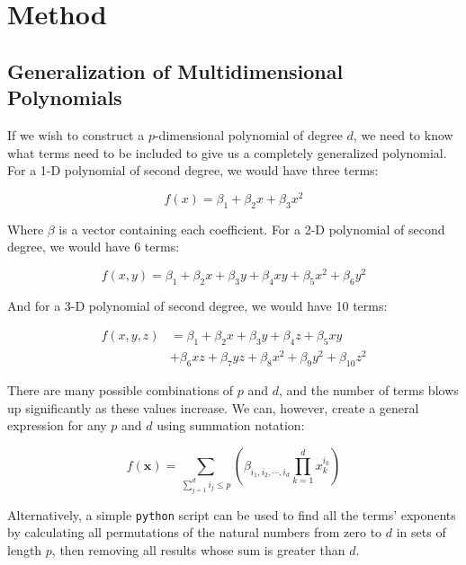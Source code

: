 \documentclass[a4paper,10pt,english]{article}
\begin{document}
\section*{Method}

\subsection*{Generalization of Multidimensional Polynomials}

If we wish to construct a $p$-dimensional polynomial of degree $d$, we need to know what terms need to be included to give us a completely generalized polynomial.  For a 1-D polynomial of second degree, we would have three terms:

\begin{equation*}
f(x) = \beta_1 + \beta_2 x + \beta_3 x^2
\end{equation*}

Where $\beta$ is a vector containing each coefficient.	For a 2-D polynomial of second degree, we would have 6 terms:

\begin{equation*}
f(x,y) = \beta_1 + \beta_2 x + \beta_3 y + \beta_4 xy + \beta_5 x^2 + \beta_6 y^2
\end{equation*}

And for a 3-D polynomial of second degree, we would have 10 terms:

\begin{align*}
f(x,y,z) &= \beta_1 + \beta_2 x + \beta_3 y + \beta_4 z + \beta_5 xy \\ &+ \beta_6 xz + \beta_7 yz + \beta_8 x^2 + \beta_9 y^2 + \beta_{10} z^2
\end{align*}

There are many possible combinations of $p$ and $d$, and the number of terms blows up significantly as these values increase.  We can, however, create a general expression \cite{2482654} for any $p$ and $d$ using summation notation:

\begin{equation}
\label{eq_method_0}
f(\mathbf{x}) = \sum_{\sum_{j = 1}^d i_j \leq p} \left( \beta_{i_1, i_2, \cdots, i_d} \prod_{k = 1}^d x_k^{i_k} \right)
\end{equation}

Alternatively, a simple \texttt{python} script can be used to find all the terms' exponents by calculating all permutations of the natural numbers from zero to $d$ in sets of length $p$, then removing all results whose sum is greater than $d$.
\end{document}
